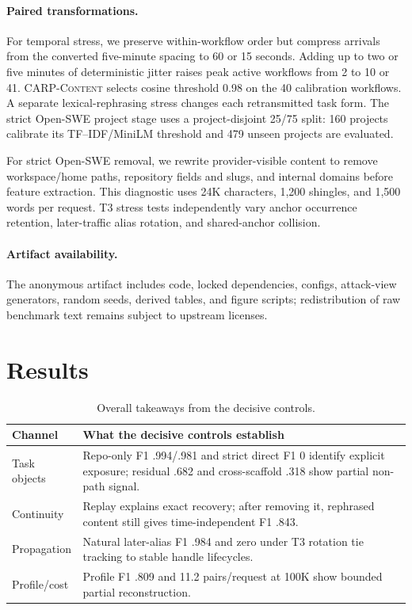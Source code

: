\documentclass[letterpaper]{article}
\newcommand{\carpcontent}{\textsc{CARP-Content}\xspace}
\begin{document}
\paragraph{Paired transformations.}
For temporal stress, we preserve within-workflow order but compress arrivals from the converted
five-minute spacing to 60 or 15 seconds. Adding up to two or five minutes of deterministic jitter
raises peak active workflows from 2 to 10 or 41. \carpcontent selects cosine threshold 0.98 on the 40
calibration workflows. A separate lexical-rephrasing stress changes each retransmitted task form.
The strict Open-SWE project stage uses a project-disjoint 25/75 split: 160 projects calibrate its
TF--IDF/MiniLM threshold and 479 unseen projects are evaluated.

For strict Open-SWE removal, we rewrite provider-visible content to remove workspace/home paths,
repository fields and slugs, and internal domains before feature extraction. This diagnostic uses
24K characters, 1,200 shingles, and 1,500 words per request. T3 stress tests independently vary
anchor occurrence retention, later-traffic alias rotation, and shared-anchor collision.

\paragraph{Artifact availability.}
The anonymous artifact includes code, locked dependencies, configs, attack-view generators,
random seeds, derived tables, and figure scripts; redistribution of raw benchmark text remains
subject to upstream licenses.

\section{Results}

\begin{table}[h]
\centering
\footnotesize
\begin{tabular}{@{}p{}p{}@{}}
\toprule
Channel & What the decisive controls establish \tabularnewline
\midrule
\raggedright Task objects & \raggedright Repo-only F1 .994/.981 and strict direct F1 0 identify explicit exposure; residual .682 and cross-scaffold .318 show partial non-path signal. \tabularnewline
\raggedright Continuity & \raggedright Replay explains exact recovery; after removing it, rephrased content still gives time-independent F1 .843. \tabularnewline
\raggedright Propagation & \raggedright Natural later-alias F1 .984 and zero under T3 rotation tie tracking to stable handle lifecycles. \tabularnewline
\raggedright Profile/cost & \raggedright Profile F1 .809 and 11.2 pairs/request at 100K show bounded partial reconstruction. \tabularnewline
\bottomrule
\end{tabular}
\caption{Overall takeaways from the decisive controls.}
\label{tab:takeaways}
\end{table}
\end{document}
